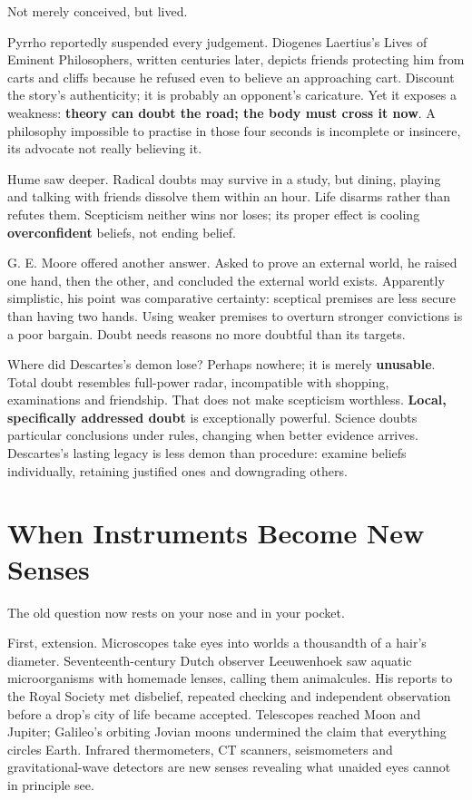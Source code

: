 Not merely conceived, but lived.

Pyrrho reportedly suspended every judgement. Diogenes Laertius's Lives of Eminent Philosophers, written centuries later, depicts friends protecting him from carts and cliffs because he refused even to believe an approaching cart. Discount the story's authenticity; it is probably an opponent's caricature. Yet it exposes a weakness: \textbf{theory can doubt the road; the body must cross it now}. A philosophy impossible to practise in those four seconds is incomplete or insincere, its advocate not really believing it.

Hume saw deeper. Radical doubts may survive in a study, but dining, playing and talking with friends dissolve them within an hour. Life disarms rather than refutes them. Scepticism neither wins nor loses; its proper effect is cooling \textbf{overconfident} beliefs, not ending belief.

G. E. Moore offered another answer. Asked to prove an external world, he raised one hand, then the other, and concluded the external world exists. Apparently simplistic, his point was comparative certainty: sceptical premises are less secure than having two hands. Using weaker premises to overturn stronger convictions is a poor bargain. Doubt needs reasons no more doubtful than its targets.

Where did Descartes's demon lose? Perhaps nowhere; it is merely \textbf{unusable}. Total doubt resembles full-power radar, incompatible with shopping, examinations and friendship. That does not make scepticism worthless. \textbf{Local, specifically addressed doubt} is exceptionally powerful. Science doubts particular conclusions under rules, changing when better evidence arrives. Descartes's lasting legacy is less demon than procedure: examine beliefs individually, retaining justified ones and downgrading others.

\section{When Instruments Become New Senses}
The old question now rests on your nose and in your pocket.

First, extension. Microscopes take eyes into worlds a thousandth of a hair's diameter. Seventeenth-century Dutch observer Leeuwenhoek saw aquatic microorganisms with homemade lenses, calling them animalcules. His reports to the Royal Society met disbelief, repeated checking and independent observation before a drop's city of life became accepted. Telescopes reached Moon and Jupiter; Galileo's orbiting Jovian moons undermined the claim that everything circles Earth. Infrared thermometers, CT scanners, seismometers and gravitational-wave detectors are new senses revealing what unaided eyes cannot in principle see.

